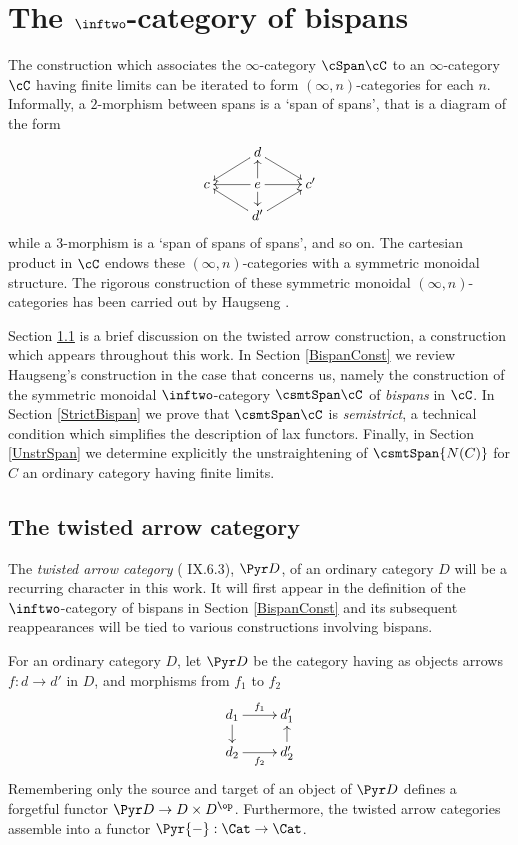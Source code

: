 \documentclass[a4paper]{article}
\numberwithin{equation}{section}
\begin{document}
\section{The \texorpdfstring{$\inftwo$}{(oo,2)}-category of bispans}
\label{Sec:bispans}


The construction which associates the $\infty$-category $\cSpan \cC$ to an $\infty$-category $\cC$ having finite limits can be iterated to form $(\infty,n)$-categories for each $n$. Informally, a $2$-morphism between spans is a `span of spans', that is a diagram of the form
\begin{equation*}
 \xymatrixrowsep{.8pc}\xymatrix{ & d \ar[rd] \ar[ld] & \\
 c & e \ar[u] \ar[d] \ar[r] \ar[l]& c' \\
 & d' \ar[ru] \ar[lu] & }
\end{equation*}
while a $3$-morphism is a `span of spans of spans', and so on. The cartesian product in $\cC$ endows these $(\infty,n)$-categories with a symmetric monoidal structure. The rigorous construction of these symmetric monoidal $(\infty,n)$-categories has been carried out by Haugseng \cite{RuneSpans}. 

Section \ref{Sec:twisted} is a brief discussion on the twisted arrow construction, a construction which appears throughout this work. In Section \ref{BispanConst} we review Haugseng's construction in the case that concerns us, namely the construction of the symmetric monoidal $\inftwo$-category $\csmtSpan \cC$ of {\em bispans} in $\cC$. In Section \ref{StrictBispan} we prove that $\csmtSpan \cC$ is {\em semistrict}, a technical condition which simplifies the description of lax functors. Finally, in Section \ref{UnstrSpan} we determine explicitly the unstraightening of $\csmtSpan{N(C)}$ for $C$ an ordinary category having finite limits.


\subsection{The twisted arrow category}
\label{Sec:twisted}

The {\em twisted arrow category} (\cite{MacLane} IX.6.3), $\Pyr D$, of an ordinary category $D$ will be a recurring character in this work. It will first appear in the definition of the $\inftwo$-category of bispans in Section \ref{BispanConst} and its subsequent reappearances will be tied to various constructions involving bispans. 

For an ordinary category $D$, let $\Pyr D$ be the category having as objects arrows $f:d \to d'$ in $D$, and morphisms from $f_1$ to $f_2$ 
\begin{equation*}
 \xymatrixrowsep{.9pc} \xymatrix{d_1 \ar[r]^-{f_1} \ar[d] & d_1' \\
 d_2 \ar[r]_-{f_2} & d_2' \ar[u] }
\end{equation*}
Remembering only the source and target of an object of $\Pyr D$ defines a forgetful functor $\Pyr D \to D \times D^\op$. Furthermore, the twisted arrow categories assemble into a functor $\Pyr {-}:\Cat \to \Cat$.
\end{document}
